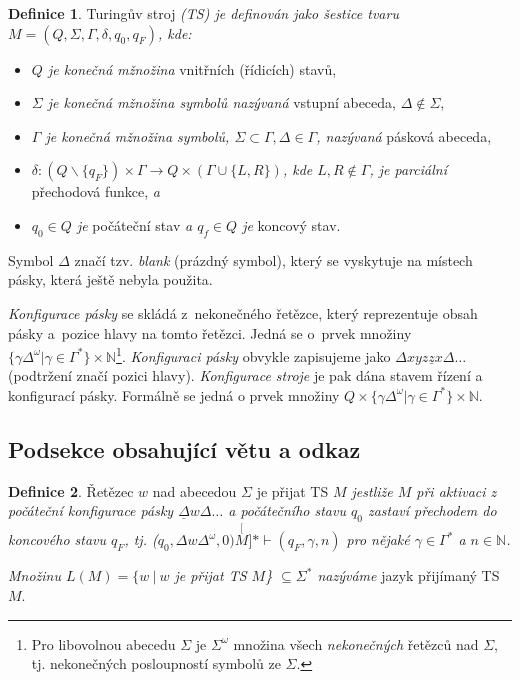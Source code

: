\documentclass[czech,a4paper,11pt,twocolumn]{article}
\theoremstyle{definition}
\newtheorem{definice}{Definice}
\theoremstyle{definition}
\theoremstyle{definition}
\begin{document}
\begin{definice}
\label{definice1} Turingův stroj \emph{(TS) je definován jako šestice tvaru $M=(Q,\Sigma,\Gamma,\delta,q_{0}, q_{F})$, kde:}
\begin{itemize}
\itemsep0.05em
\item \emph{$Q$ je konečná mžnožina} vnitřních (řídicích) stavů,
\item \emph{$\Sigma$ je konečná mžnožina symbolů nazývaná} vstupní abeceda, $\Delta \notin \Sigma$,
\item \emph{$\Gamma$ je konečná mžnožina symbolů, $\Sigma \subset \Gamma, \Delta \in \Gamma$, nazývaná} pásková abeceda,
\item \emph{$\delta : (Q \backslash \{q_{F}\}) \times \Gamma \rightarrow  Q \times (\Gamma\!\cup\!\{L,R\})$, kde $L,R\notin\Gamma$, je parciální} přechodová funkce, \emph{a}
\item \emph{$q_0 \in Q$ je} počáteční stav \emph{a $q_f \in Q$ je} koncový stav.
\end{itemize}

Symbol $\Delta$ značí tzv. \emph{blank} (prázdný symbol), který se vyskytuje na místech pásky, která ještě nebyla použita.

\emph{Konfigurace pásky} se skládá z~nekonečného řetězce, který reprezentuje obsah pásky a~pozice hlavy na tomto řetězci. Jedná se o~prvek množiny $\{\gamma \Delta^\omega | \gamma \in \Gamma^*\} \times \mathbb{N}$\footnote{Pro libovolnou abecedu $\Sigma$ je $\Sigma^\omega$ množina všech \emph{nekonečných} řetězců nad $\Sigma$, tj. nekonečných posloupností symbolů ze $\Sigma$.}.
\emph{Konfiguraci pásky} obvykle zapisujeme jako $\Delta x y z \underline{z} x \Delta \ldots$ (podtržení značí pozici hlavy). \emph{Konfigurace stroje} je pak dána stavem řízení a konfigurací pásky. Formálně se jedná o prvek množiny $Q \times \{\gamma \Delta^\omega | \gamma \in \Gamma^*\} \times \mathbb{N}$.
\end{definice}

\subsection{Podsekce obsahující větu a odkaz}
\begin{definice}
\label{definice2} Řetězec $w$ nad abecedou $\Sigma$ je přijat TS \emph{$M$ jestliže $M$ při aktivaci z počáteční konfigurace pásky $\underline{\Delta} w \Delta \ldots$ a počátečního stavu $q_0$ zastaví přechodem do koncového stavu $q_F$, tj. ($q_0, \Delta w \Delta^\omega, 0) \stackrel[M]{*}{\vdash} (q_F, \gamma, n)$ pro nějaké $\gamma \in \Gamma^* $ a $ n \in \mathbb{N}$.}

\emph{Množinu $L(M) = \{w\:|\:w$ je přijat TS $M$\} $\subseteq \Sigma^*$ nazýváme} jazyk přijímaný TS $M$.
\end{definice}
\end{document}
